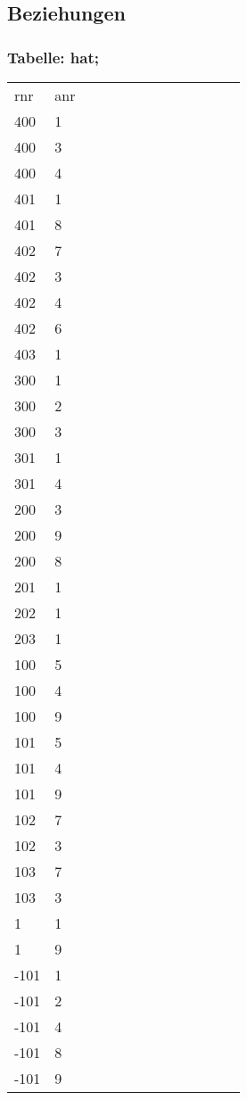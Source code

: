 \documentclass[fleqn]{scrartcl}
\begin{document}
\subsection{Beziehungen} 
\subsubsection{Tabelle: hat;}
\begin{tabular}{|l|l|l|l|l|l|l|l|l|l|l|l|l|}\toprule
\rowcolor{green!20}
\multicolumn{2}{|c|}{
hat;
}\\\midrule
\rowcolor{yellow!30}rnr & anr  \\\midrule
400& 1  \\ 
400& 3  \\ 
400& 4  \\ 
401& 1  \\ 
401& 8  \\ 
402& 7  \\ 
402& 3  \\ 
402& 4  \\ 
402& 6  \\ 
403& 1  \\ 
300& 1  \\ 
300& 2  \\ 
300& 3  \\ 
301& 1  \\ 
301& 4  \\ 
200& 3  \\ 
200& 9  \\ 
200& 8  \\ 
201& 1  \\ 
202& 1  \\ 
203& 1  \\ 
100& 5  \\ 
100& 4  \\ 
100& 9  \\ 
101& 5  \\ 
101& 4  \\ 
101& 9  \\ 
102& 7  \\ 
102& 3  \\ 
103& 7  \\ 
103& 3  \\ 
1& 1  \\ 
1& 9  \\ 
-101& 1  \\ 
-101& 2  \\ 
-101& 4  \\ 
-101& 8  \\ 
-101& 9  \\ 
\bottomrule
\end{tabular}
\end{document}
